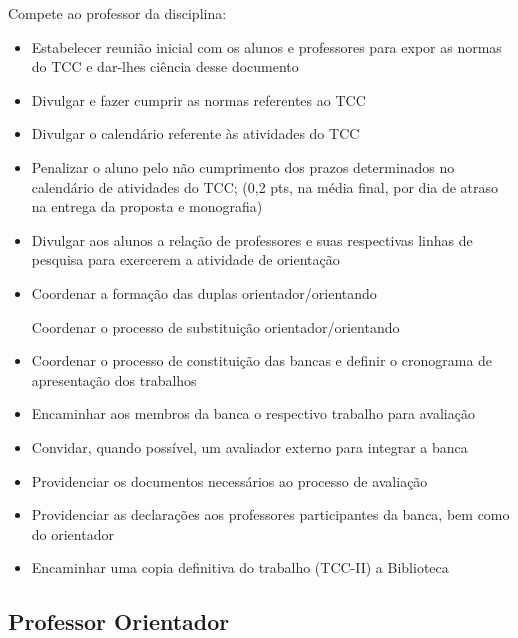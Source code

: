 Compete ao professor da disciplina:

	\begin{itemize}
		\item Estabelecer reunião inicial com os alunos e professores para expor as normas do TCC e dar-lhes ciência desse documento

		\item Divulgar e fazer cumprir as normas referentes ao TCC
		
		\item Divulgar o calendário referente às atividades do TCC

		\item Penalizar o aluno pelo não cumprimento dos prazos determinados no calendário de atividades do TCC; (0,2 pts, na média final, por dia de atraso na entrega 		da proposta e monografia)
		
		\item Divulgar aos alunos a relação de professores e suas respectivas linhas de pesquisa para exercerem a atividade de orientação
		
		\item Coordenar a formação das duplas orientador/orientando

		\intem Coordenar o processo de substituição orientador/orientando
		
		\item Coordenar o processo de constituição das bancas e definir o cronograma de apresentação dos trabalhos
		
		\item Encaminhar aos membros da banca o respectivo trabalho para avaliação
		
		\item Convidar, quando possível, um avaliador externo para integrar a banca
		
		\item Providenciar os documentos necessários ao processo de avaliação

		\item Providenciar as declarações aos professores participantes da banca, bem como do orientador
		
		\item Encaminhar uma c\´opia definitiva do trabalho (TCC-II) \´a Biblioteca
		
	\end{itemize}


\subsection{Professor Orientador}

